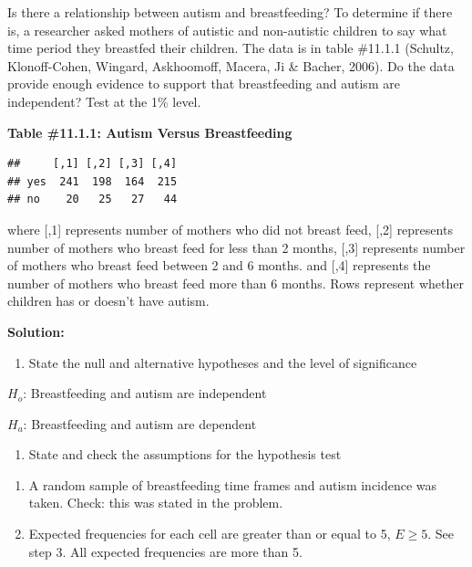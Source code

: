 \documentclass[
]{book}
\providecommand{\tightlist}{%
  \setlength{\itemsep}{0pt}\setlength{\parskip}{0pt}}
\begin{document}
Is there a relationship between autism and breastfeeding? To determine if there is, a researcher asked mothers of autistic and non-autistic children to say what time period they breastfed their children. The data is in table \#11.1.1 (Schultz, Klonoff-Cohen, Wingard, Askhoomoff, Macera, Ji \& Bacher, 2006). Do the data provide enough evidence to support that breastfeeding and autism are independent? Test at the 1\% level.

\textbf{Table \#11.1.1: Autism Versus Breastfeeding}

\begin{verbatim}
##     [,1] [,2] [,3] [,4]
## yes  241  198  164  215
## no    20   25   27   44
\end{verbatim}

where {[},1{]} represents number of mothers who did not breast feed, {[},2{]} represents number of mothers who breast feed for less than 2 months, {[},3{]} represents number of mothers who breast feed between 2 and 6 months. and {[},4{]} represents the number of mothers who breast feed more than 6 months. Rows represent whether children has or doesn't have autism.

\textbf{Solution:}

\begin{enumerate}
\def\labelenumi{\arabic{enumi}.}
\tightlist
\item
  State the null and alternative hypotheses and the level of significance
\end{enumerate}

\(H_o\): Breastfeeding and autism are independent

\(H_a\): Breastfeeding and autism are dependent

\begin{enumerate}
\def\labelenumi{\arabic{enumi}.}
\setcounter{enumi}{1}
\tightlist
\item
  State and check the assumptions for the hypothesis test
\end{enumerate}

\begin{enumerate}
\def\labelenumi{\alph{enumi}.}
\item
  A random sample of breastfeeding time frames and autism incidence was taken. Check: this was stated in the problem.
\item
  Expected frequencies for each cell are greater than or equal to 5, \(E\ge 5\). See step 3. All expected frequencies are more than 5.
\end{enumerate}
\end{document}
